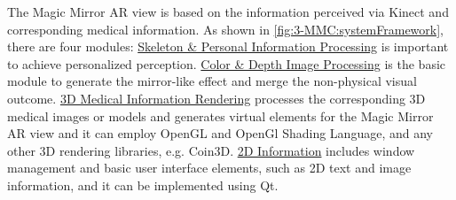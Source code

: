 The Magic Mirror AR view is based on the information perceived via Kinect and corresponding medical information. As shown in \figurename{\ref{fig:3-MMC:systemFramework}}, there are four modules:
\ul{Skeleton \& Personal Information Processing} is important to achieve personalized perception. 
\ul{Color \& Depth Image Processing} is the basic module to generate the mirror-like effect and merge the non-physical visual outcome. \ul{3D Medical Information Rendering} processes the corresponding 3D medical images or models and generates virtual elements for the Magic Mirror AR view and it can employ OpenGL and OpenGl Shading Language, and any other 3D rendering libraries, e.g. Coin3D. \ul{2D Information} includes window management and basic user interface elements, such as 2D text and image information, and it can be implemented using Qt.

